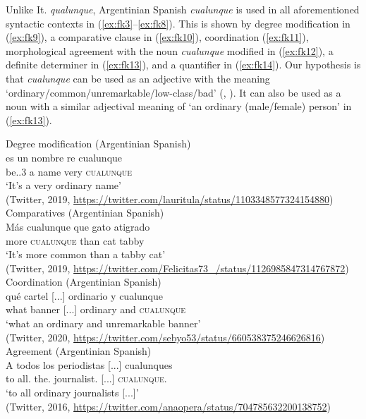 \documentclass[output=paper,colorlinks,citecolor=brown]{langscibook}
\begin{document}
Unlike It. \textit{qualunque}, Argentinian Spanish \textit{cualunque} is used in all aforementioned syntactic contexts in (\ref{ex:fk3}--\ref{ex:fk8}). This is shown by degree modification in (\ref{ex:fk9}), a comparative clause in (\ref{ex:fk10}), coordination (\ref{ex:fk11}), morphological agreement with the noun \textit{cualunque} modified in (\ref{ex:fk12}), a definite determiner in (\ref{ex:fk13}), and a quantifier in (\ref{ex:fk14}). Our hypothesis is that \textit{cualunque} can be used as an adjective with the meaning ‘ordinary/common/unremarkable/low-class/bad’ (\cite{RealAcademiaEspañola2010}, \cite[223]{HaenschWerner2000}). It can also be used as a noun with a similar adjectival meaning of ‘an ordinary (male/female) person’ in (\ref{ex:fk13}). 

\ea\label{ex:fk9} Degree modification (Argentinian Spanish)\\
   \gll es un nombre re cualunque\\
    be.{\PRS.3\SG} a name very \textsc{cualunque}\\
   \glt ‘It’s a very ordinary name’\\
    (Twitter, 2019, \url{https://twitter.com/lauritula/status/1103348577324154880})
\ex \label{ex:fk10}Comparatives (Argentinian Spanish)\\
    \gll Más cualunque que gato atigrado\\
    more \textsc{cualunque} than cat tabby\\
    \glt ‘It’s more common than a tabby cat’\\
    (Twitter, 2019, \url{https://twitter.com/Felicitas73_/status/1126985847314767872})
\ex \label{ex:fk11}Coordination (Argentinian Spanish)\\
    \gll qué cartel [...] ordinario y cualunque\\
    what banner [...] ordinary and \textsc{cualunque}\\
    \glt ‘what an ordinary and unremarkable banner’\\
    (Twitter, 2020, \url{https://twitter.com/sebyo53/status/660538375246626816})
\ex \label{ex:fk12}Agreement (Argentinian Spanish)\\
    \gll A todos los periodistas [...] cualunques\\
    to {all.\PL} {the.\PL} {journalist.\PL} [...] {\textsc{cualunque}.\PL}\\
    \glt ‘to all ordinary journalists [...]’\\
    (Twitter, 2016, \url{https://twitter.com/anaopera/status/704785632200138752})
\end{document}
